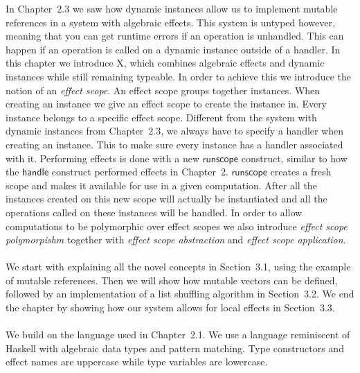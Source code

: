 \iffalse
In this chapter we will give an introduction to programming with X.
X is a modification of the algebraic effects system described in Chapter~2.1, extended with a restricted form of the dynamic instances of Chapter~2.3.
We introduce the novel concepts of X.
When create a new instance we have to give handler, this ensures that the instance is always associated with a handler.
The $\mathsf{runscope}$ construct can handle multiple effects at the same time.
These effects are collected under a notion of \emph{effect scope}, which is used to group instances together.
When runscope is called one such effect scope is handled.
We introduce \emph{effect scope polymorphism} together with \emph{effect scope abstraction} and {effect scope application}.
These constructs allows us to write functions which are polymorphic over effect scopes.
\fi

In Chapter~2.3 we saw how dynamic instances allow us to implement mutable references in a system with algebraic effects.
This system is untyped however, meaning that you can get runtime errors if an operation is unhandled.
This can happen if an operation is called on a dynamic instance outside of a handler.
In this chapter we introduce X, which combines algebraic effects and dynamic instances while still remaining typeable.
In order to achieve this we introduce the notion of an \emph{effect scope}.
An effect scope groups together instances.
When creating an instance we give an effect scope to create the instance in.
Every instance belongs to a specific effect scope.
Different from the system with dynamic instances from Chapter~2.3, we always have to specify a handler when creating an instance.
This to make sure every instance has a handler associated with it.
Performing effects is done with a new $\mathsf{runscope}$ construct, similar to how the $\mathsf{handle}$ construct performed effects in Chapter~2.
$\mathsf{runscope}$ creates a fresh scope and makes it available for use in a given computation.
After all the instances created on this new scope will actually be instantiated and all the operations called on these instances will be handled.
In order to allow computations to be polymorphic over effect scopes we also introduce \emph{effect scope polymorpishm} together with \emph{effect scope abstraction} and \emph{effect scope application}.
\\\\
We start with explaining all the novel concepts in Section~3.1, using the example of mutable references.
Then we will show how mutable vectors can be defined, followed by an implementation of a list shuffling algorithm in Section~3.2.
We end the chapter by showing how our system allows for local effects in Section~3.3.
\\\\
We build on the language used in Chapter~2.1.
We use a language reminiscent of Haskell with algebraic data types and pattern matching.
Type constructors and effect names are uppercase while type variables are lowercase.

